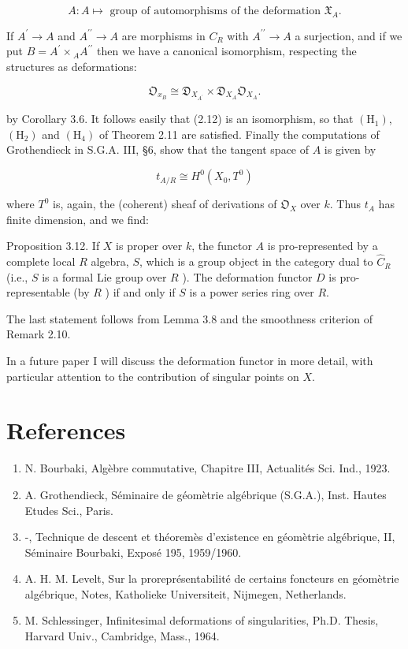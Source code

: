 \documentclass[10pt]{article}
\begin{document}
$$
A: A \mapsto \text { group of automorphisms of the deformation } \mathfrak{X}_{A} .
$$

If $A^{\prime} \rightarrow A$ and $A^{\prime \prime} \rightarrow A$ are morphisms in $C_{R}$ with $A^{\prime \prime} \rightarrow A$ a surjection, and if we put $B=A^{\prime} \times{ }_{A} A^{\prime \prime}$ then we have a canonical isomorphism, respecting the structures as deformations:

$$
\mathfrak{O}_{x_{B}} \cong \mathfrak{D}_{X_{A^{\prime}}} \times \mathfrak{D}_{X_{A}} \mathfrak{O}_{X_{A}} .
$$

by Corollary 3.6. It follows easily that (2.12) is an isomorphism, so that $\left(\mathrm{H}_{1}\right)$, $\left(\mathrm{H}_{2}\right)$ and $\left(\mathrm{H}_{4}\right)$ of Theorem 2.11 are satisfied. Finally the computations of Grothendieck in S.G.A. III, §6, show that the tangent space of $A$ is given by

$$
t_{A / R} \cong H^{0}\left(X_{0}, T^{0}\right)
$$

where $T^{0}$ is, again, the (coherent) sheaf of derivations of $\mathfrak{O}_{X}$ over $k$. Thus $t_{A}$ has finite dimension, and we find:

Proposition 3.12. If $X$ is proper over $k$, the functor $A$ is pro-represented by a complete local $R$ algebra, $S$, which is a group object in the category dual to $\hat{C}_{R}$ (i.e., $S$ is a formal Lie group over $R$ ). The deformation functor $D$ is pro-representable (by $R$ ) if and only if $S$ is a power series ring over $R$.

The last statement follows from Lemma 3.8 and the smoothness criterion of Remark 2.10.

In a future paper I will discuss the deformation functor in more detail, with particular attention to the contribution of singular points on $X$.

\section*{References}
\begin{enumerate}
  \item N. Bourbaki, Algèbre commutative, Chapitre III, Actualités Sci. Ind., 1923.
  \item A. Grothendieck, Séminaire de géomètrie algébrique (S.G.A.), Inst. Hautes Etudes Sci., Paris.
  \item -, Technique de descent et théoremès d'existence en géomètrie algébrique, II, Séminaire Bourbaki, Exposé 195, 1959/1960.
  \item A. H. M. Levelt, Sur la proreprésentabilité de certains foncteurs en géomètrie algébrique, Notes, Katholieke Universiteit, Nijmegen, Netherlands.
  \item M. Schlessinger, Infinitesimal deformations of singularities, Ph.D. Thesis, Harvard Univ., Cambridge, Mass., 1964.
\end{enumerate}
\end{document}

